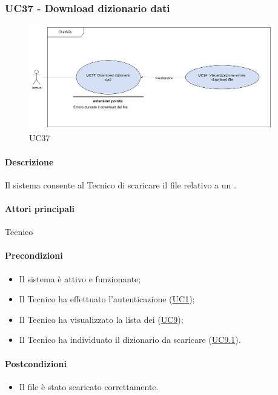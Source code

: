 \subsubsection{UC37 - Download dizionario dati}\label{UC37}

\begin{figure}[H]
  \centering
  \includegraphics[width=0.95\textwidth]{assets/uc37.png}
  \caption{UC37}
\end{figure}

\paragraph*{Descrizione}
Il sistema consente al Tecnico di scaricare il file relativo a un .

\paragraph*{Attori principali}
Tecnico

\paragraph*{Precondizioni}
\begin{itemize}
  \item Il sistema è attivo e funzionante;
  \item Il Tecnico ha effettuato l'autenticazione (\hyperref[UC1]{UC1});
  \item Il Tecnico ha visualizzato la lista dei  (\hyperref[UC9]{UC9});
  \item Il Tecnico ha individuato il dizionario da scaricare (\hyperref[UC9.1]{UC9.1}).
\end{itemize}

\paragraph*{Postcondizioni}
\begin{itemize}
  \item Il file è stato scaricato correttamente.
\end{itemize}

